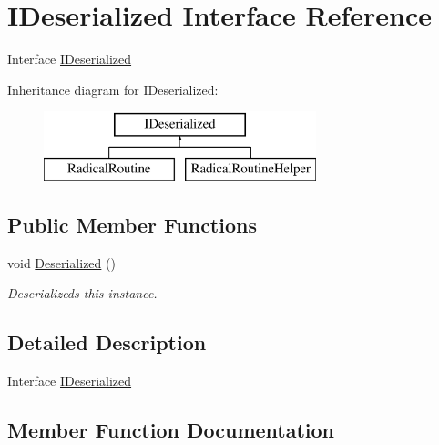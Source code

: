 \hypertarget{interface_i_deserialized}{}\section{I\+Deserialized Interface Reference}
\label{interface_i_deserialized}


Interface \hyperlink{interface_i_deserialized}{I\+Deserialized}  


Inheritance diagram for I\+Deserialized\+:\begin{figure}[H]
\begin{center}
\leavevmode
\includegraphics[height=2.000000cm]{interface_i_deserialized}
\end{center}
\end{figure}
\subsection*{Public Member Functions}
\begin{DoxyCompactItemize}
\item 
void \hyperlink{interface_i_deserialized_a87ea2dedb353ae446a8db2187819d184}{Deserialized} ()
\begin{DoxyCompactList}\small\item\em Deserializeds this instance. \end{DoxyCompactList}\end{DoxyCompactItemize}


\subsection{Detailed Description}
Interface \hyperlink{interface_i_deserialized}{I\+Deserialized} 



\subsection{Member Function Documentation}
\mbox{\label{interface_i_deserialized_a87ea2dedb353ae446a8db2187819d184}} 
